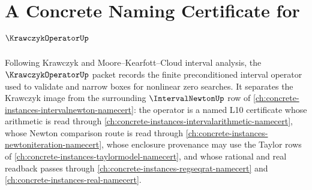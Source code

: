 \chapter{A Concrete Naming Certificate for $\KrawczykOperatorUp$}
\label{ch:concrete-instances-krawczyk-operator-namecert}

Following Krawczyk and Moore--Kearfott--Cloud interval analysis, the $\KrawczykOperatorUp$ packet records the finite preconditioned interval operator used to validate and narrow boxes for nonlinear zero searches. It separates the Krawczyk image from the surrounding $\IntervalNewtonUp$ row of \autoref{ch:concrete-instances-intervalnewton-namecert}: the operator is a named L10 certificate whose arithmetic is read through \autoref{ch:concrete-instances-intervalarithmetic-namecert}, whose Newton comparison route is read through \autoref{ch:concrete-instances-newtoniteration-namecert}, whose enclosure provenance may use the Taylor rows of \autoref{ch:concrete-instances-taylormodel-namecert}, and whose rational and real readback passes through \autoref{ch:concrete-instances-regseqrat-namecert} and \autoref{ch:concrete-instances-real-namecert}.

